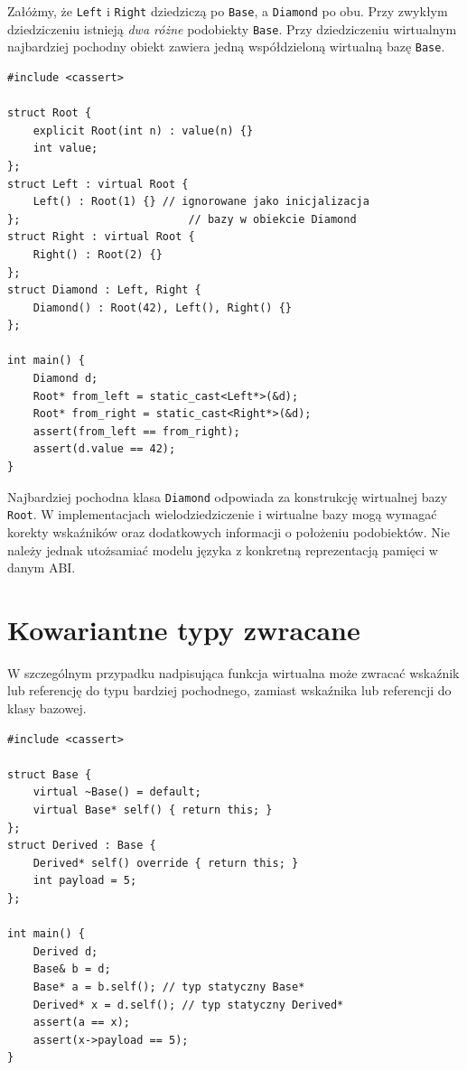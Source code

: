 Załóżmy, że \texttt{Left} i \texttt{Right} dziedziczą po
\texttt{Base}, a \texttt{Diamond} po obu. Przy zwykłym
dziedziczeniu istnieją \emph{dwa różne} podobiekty \texttt{Base}.
Przy dziedziczeniu wirtualnym najbardziej pochodny obiekt zawiera
jedną współdzieloną wirtualną bazę \texttt{Base}.

\begin{lstlisting}[caption={Jedna wirtualna baza we wzorcu diamentu (C++11); kompletny program.}]
#include <cassert>

struct Root {
    explicit Root(int n) : value(n) {}
    int value;
};
struct Left : virtual Root {
    Left() : Root(1) {} // ignorowane jako inicjalizacja
};                          // bazy w obiekcie Diamond
struct Right : virtual Root {
    Right() : Root(2) {}
};
struct Diamond : Left, Right {
    Diamond() : Root(42), Left(), Right() {}
};

int main() {
    Diamond d;
    Root* from_left = static_cast<Left*>(&d);
    Root* from_right = static_cast<Right*>(&d);
    assert(from_left == from_right);
    assert(d.value == 42);
}
\end{lstlisting}

\noindent Najbardziej pochodna klasa \texttt{Diamond} odpowiada
za konstrukcję wirtualnej bazy \texttt{Root}. W implementacjach
wielodziedziczenie i wirtualne bazy mogą wymagać korekty wskaźników
oraz dodatkowych informacji o położeniu podobiektów.
Nie należy jednak utożsamiać modelu języka z konkretną reprezentacją
pamięci w danym ABI.

\section{Kowariantne typy zwracane}

W szczególnym przypadku nadpisująca funkcja wirtualna może zwracać
wskaźnik lub referencję do typu bardziej pochodnego, zamiast
wskaźnika lub referencji do klasy bazowej.

\begin{lstlisting}[caption={Kowariantny typ wyniku metody wirtualnej (C++11); kompletny program.}]
#include <cassert>

struct Base {
    virtual ~Base() = default;
    virtual Base* self() { return this; }
};
struct Derived : Base {
    Derived* self() override { return this; }
    int payload = 5;
};

int main() {
    Derived d;
    Base& b = d;
    Base* a = b.self(); // typ statyczny Base*
    Derived* x = d.self(); // typ statyczny Derived*
    assert(a == x);
    assert(x->payload == 5);
}
\end{lstlisting}

